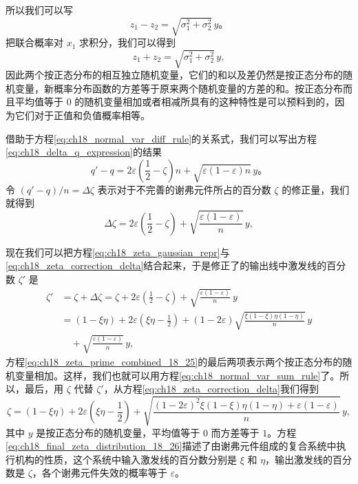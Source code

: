 所以我们可以写
\begin{equation}
z_1 - z_2 = \sqrt{\sigma_1^2+\sigma_2^2}\,y。
\label{eq:ch18_normal_var_diff_rule}
\end{equation}
把联合概率对 $x_1$ 求积分，我们可以得到
\begin{equation}
z_1 + z_2 = \sqrt{\sigma_1^2+\sigma_2^2}\,y,
\label{eq:ch18_normal_var_sum_rule}
\end{equation}
因此两个按正态分布的相互独立随机变量，它们的和以及差仍然是按正态分布的随机变量，新概率分布函数的方差等于原来两个随机变量的方差的和。按正态分布而且平均值等于 $0$ 的随机变量相加或者相减所具有的这种特性是可以预料到的，因为它们对于正值和负值概率相等。

借助于方程\eqref{eq:ch18_normal_var_diff_rule}的关系式，我们可以写出方程\eqref{eq:ch18_delta_q_expression}的结果
\begin{equation*}
q'-q = 2\varepsilon\left(\frac{1}{2}-\zeta\right)n + \sqrt{\varepsilon(1-\varepsilon)n}\,y。
\end{equation*}
令 $(q'-q)/n=\Delta\zeta$ 表示对于不完善的谢弗元件所占的百分数 $\zeta$ 的修正量，我们就得到
\begin{equation}
\Delta\zeta = 2\varepsilon\left(\frac{1}{2}-\zeta\right) + \sqrt{\frac{\varepsilon(1-\varepsilon)}{n}}\,y,
\label{eq:ch18_zeta_correction_delta}
\end{equation}

现在我们可以把方程\eqref{eq:ch18_zeta_gaussian_repr}与\eqref{eq:ch18_zeta_correction_delta}结合起来，于是修正了的输出线中激发线的百分数 $\zeta'$ 是
\begin{equation}
\begin{aligned}
\zeta' &= \zeta + \Delta\zeta = \zeta + 2\varepsilon\left(\frac{1}{2}-\zeta\right) + \sqrt{\frac{\varepsilon(1-\varepsilon)}{n}}\,y \\
&= (1-\xi\eta) + 2\varepsilon\left(\xi\eta - \frac{1}{2}\right) + (1-2\varepsilon)\sqrt{\frac{\xi(1-\xi)\eta(1-\eta)}{n}}\,y \\
&\quad + \sqrt{\frac{\varepsilon(1-\varepsilon)}{n}}\,y,
\end{aligned}
\label{eq:ch18_zeta_prime_combined_18_25}
\end{equation}
方程\eqref{eq:ch18_zeta_prime_combined_18_25}的最后两项表示两个按正态分布的随机变量相加。这样，我们也就可以用方程\eqref{eq:ch18_normal_var_sum_rule}了。所以，最后，用 $\zeta$ 代替 $\zeta'$，从方程\eqref{eq:ch18_zeta_correction_delta}我们得到
\begin{equation}
\zeta = (1-\xi\eta) + 2\varepsilon\left(\xi\eta - \frac{1}{2}\right) + \sqrt{\frac{(1-2\varepsilon)^2\xi(1-\xi)\eta(1-\eta) + \varepsilon(1-\varepsilon)}{n}}\,y,
\label{eq:ch18_final_zeta_distribution_18_26}
\end{equation}
其中 $y$ 是按正态分布的随机变量，平均值等于 $0$ 而方差等于 $1$。方程\eqref{eq:ch18_final_zeta_distribution_18_26}描述了由谢弗元件组成的复合系统中执行机构的性质，这个系统中输入激发线的百分数分别是 $\xi$ 和 $\eta$，输出激发线的百分数是 $\zeta$，各个谢弗元件失效的概率等于 $\varepsilon$。



